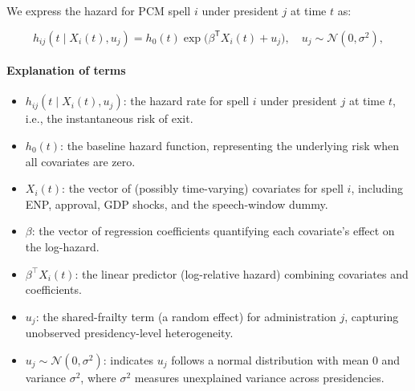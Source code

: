 \documentclass[a4paper, 12pt]{article}
\begin{document}
We express the hazard for PCM spell \(i\) under president \(j\) at time \(t\) as:

\[
  h_{ij}(t \mid X_i(t), u_j)
    = h_0(t) \exp\bigl(\beta^{\mathsf{T}}X_i(t) + u_j\bigr),
  \quad u_j \sim \mathcal{N}(0,\sigma^2),
\]


\paragraph{Explanation of terms}
\begin{itemize}
  \item $h_{ij}(t \mid X_i(t), u_j)$: the hazard rate for spell $i$ under president $j$ at time $t$, i.e., the instantaneous risk of exit.
  \item $h_0(t)$: the baseline hazard function, representing the underlying risk when all covariates are zero.
  \item $X_i(t)$: the vector of (possibly time-varying) covariates for spell $i$, including ENP, approval, GDP shocks, and the speech-window dummy.
  \item $\beta$: the vector of regression coefficients quantifying each covariate’s effect on the log-hazard.
  \item $\beta^\top X_i(t)$: the linear predictor (log-relative hazard) combining covariates and coefficients.
  \item $u_j$: the shared-frailty term (a random effect) for administration $j$, capturing unobserved presidency-level heterogeneity.
  \item $u_j \sim \mathcal{N}(0,\sigma^2)$: indicates $u_j$ follows a normal distribution with mean 0 and variance $\sigma^2$, where $\sigma^2$ measures unexplained variance across presidencies.
\end{itemize}


\end{document}
